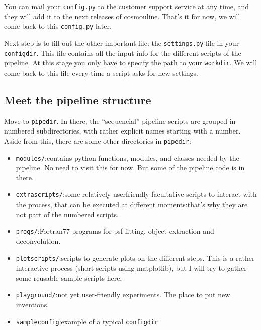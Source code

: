 You can mail your \verb+config.py+ to the customer support service at any time, and they will add it to the next releases of cosmouline. That's it for now, we will come back to this \verb+config.py+ later.

Next step is to fill out the other important file: the \verb+settings.py+ file in your \verb+configdir+. This file contains all the input info for the different scripts of the pipeline. At this stage you only have to specify the path to your \verb+workdir+. We will come back to this file every time a script asks for new settings.


\subsection{Meet the pipeline structure}

Move to \verb+pipedir+. In there, the ``sequencial'' pipeline scripts are grouped in numbered subdirectories, with rather explicit names starting with a number. Aside from this, there are some other directories in \verb+pipedir+:

\begin{itemize}
\item \verb+modules/+:contains python functions, modules, and classes needed by the pipeline. No need to visit this for now. But some of the pipeline code is in there.

\item \verb+extrascripts/+:some relatively userfriendly facultative scripts to interact with the process, that can be executed at different moments:that's why they are not part of the numbered scripts.


\item \verb+progs/+:Fortran77 programs for psf fitting, object extraction and deconvolution.

\item \verb+plotscripts/+:scripts to generate plots on the different steps. This is a rather interactive process (short scripts using matplotlib), but I will try to gather some reusable sample scripts here.

\item \verb+playground/+:not yet user-friendly experiments. The place to put new inventions.

\item \verb+sampleconfig+:example of a typical \verb+configdir+

\end{itemize}

